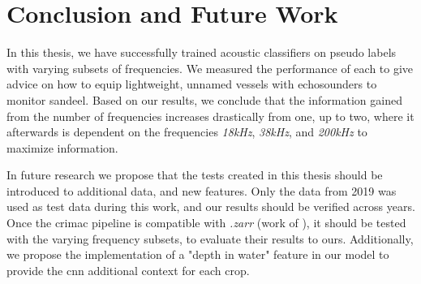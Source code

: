 \chapter{Conclusion and Future Work}
    In this thesis, we have successfully trained acoustic classifiers on pseudo labels with varying subsets of frequencies. We measured the performance of each to give advice on how to equip lightweight, unnamed vessels with echosounders to monitor sandeel.  Based on our results, we conclude that the information gained from the number of frequencies increases drastically from one, up to two, where it afterwards is dependent on the frequencies \textit{18kHz}, \textit{38kHz}, and \textit{200kHz} to maximize information.
    
    
    

    
    In future research we propose that the tests created in this thesis should be introduced to additional data, and new features. Only the data from 2019 was used as test data during this work, and our results should be verified across years. Once the \gls{crimac} pipeline is compatible with \textit{.zarr} (work of \citeauthor{brautaset2020acoustic}), it should be tested with the varying frequency subsets, to evaluate their results to ours. Additionally, we propose the implementation of a "depth in water" feature in our model to provide the \gls{cnn} additional context for each crop.
    
